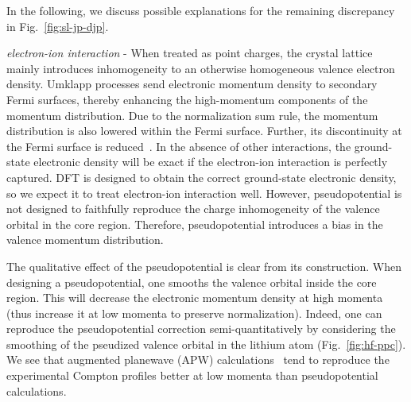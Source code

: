 \documentclass[aps,prb,showpacs,preprintnumbers,amsmath,amssymb,superscriptaddress,twocolumn]{revtex4-1}
\begin{document}
In the following, we discuss possible explanations for the remaining discrepancy in Fig.~\ref{fig:sl-jp-djp}. %

\emph{electron-ion interaction} - When treated as point charges, the crystal lattice mainly introduces inhomogeneity to an otherwise homogeneous valence electron density. Umklapp processes send electronic momentum density to secondary Fermi surfaces, thereby enhancing the high-momentum components of the momentum distribution. Due to the normalization sum rule, the momentum distribution is also lowered within the Fermi surface. Further, its discontinuity at the Fermi surface is reduced~\cite{P.EisenbergerL.LamP.M.Platzman1972}. In the absence of other interactions, the ground-state electronic density will be exact if the electron-ion interaction is perfectly captured. DFT is designed to obtain the correct ground-state electronic density, so we expect it to treat electron-ion interaction well. However, pseudopotential is not designed to faithfully reproduce the charge inhomogeneity of the valence orbital in the core region. Therefore, pseudopotential introduces a bias in the valence momentum distribution.

The qualitative effect of the pseudopotential is clear from its construction. When designing a pseudopotential, one smooths the valence orbital inside the core region. This will decrease the electronic momentum density at high momenta (thus increase it at low momenta to preserve normalization). Indeed, one can reproduce the pseudopotential correction semi-quantitatively by considering the smoothing of the pseudized valence orbital in the lithium atom (Fig.~\ref{fig:hf-ppc}). We see that augmented planewave (APW) calculations~\cite{Baruah1999,Bross2004,Bross2005,Bross2012} tend to reproduce the experimental Compton profiles better at low momenta than pseudopotential calculations.
\end{document}
